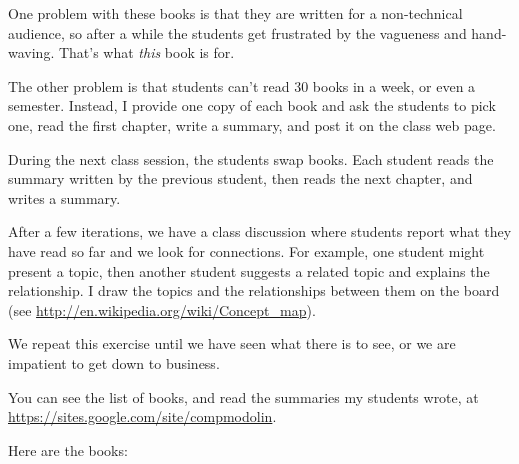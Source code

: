 \documentclass[10pt]{book}
\begin{document}
One problem with these books is that
they are written for a non-technical audience, so after a while
the students get frustrated by the vagueness and hand-waving.
That's what {\em this} book is for.

The other problem is that students can't read 30 books in a week, or
even a semester.  Instead, I provide
one copy of each book and ask the students to pick one, read
the first chapter, write a summary, and post it on the class web page.

During the next class session, the students swap books.  Each student
reads the summary written by the previous student, then reads the
next chapter, and writes a summary.

After a few iterations, we have a class discussion where students
report what they have read so far and we look for connections.  For
example, one student might present a topic, then another student
suggests a related topic and explains the relationship.  I draw the
topics and the relationships between them on the board (see
\url{http://en.wikipedia.org/wiki/Concept_map}).

We repeat this exercise until we have seen what there is to see, or we
are impatient to get down to business.

You can see the list of books, and read the summaries my students
wrote, at \url{https://sites.google.com/site/compmodolin}.

Here are the books:
\end{document}
